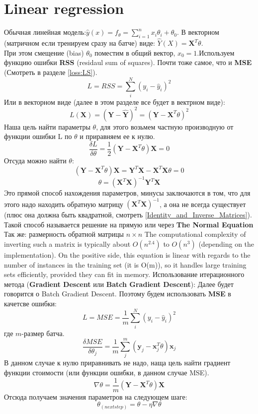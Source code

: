 \documentclass{book}
\begin{document}
\chapter{Linear regression}
Обычная линейная модель:$ \hat y(x) = f_\theta = \sum_{i=1}^{n}x_i\theta_i + \theta_0$. В векторном (матричном если тренируем сразу на батче) виде: $\hat Y(X) = \mathbf{X}^T\theta$.\\При этом смещение (bias) $\theta_0$ поместим в общий вектор, $x_0=1$.Используем функцию ошибки \textbf{RSS} (residaul sum of squares). Почти тоже самое, что и \textbf{MSE} (Смотреть в разделе \autoref{loss:LS}).$$L=RSS=\sum_i^N{(y_i-\hat y_i)^2}$$Или в векторном виде (далее в этом разделе все будет в вектрном виде):$$L(\mathbf{X})=(\mathbf{Y}-\hat{\mathbf{Y}})^2=(\mathbf{Y}-\mathbf{X}^T\theta)^2$$Наша цель найти параметры $\theta$, для этого возьмем частную производную от функции ошибки L по $\theta$ и приравняем ее к нулю.$$\frac{\delta L}{\delta \theta}=\frac{1}{2}(\mathbf{Y} - \mathbf{X}^T\theta)\mathbf{X}=0$$Отсуда можно найти $\theta$:$$(\mathbf{Y} - \mathbf{X}^T\theta)\mathbf{X}=\mathbf{Y}^T\mathbf{X}-\mathbf{X}^T\mathbf{X}\theta = 0$$ $$\theta=(\mathbf{X}^T\mathbf{X})^{-1}\mathbf{Y}^T\mathbf{X}$$Это прямой способ нахождения параметров, минусы заключаются в том, что для этого надо находить обратную матрицу $(\mathbf{X}^T\mathbf{X})^{-1}$, а она не всегда существует (плюс она должна быть квадратной, смотреть \autoref{Identity_and_Inverse_Matrices}). Такой способ называется решение на прямую или через \textbf{The Normal Equation} Так же: размерность обратной матрицы $n\times n$ The computational complexity of inverting such a matrix is typically about $O(n^2.4)$ to $O(n^3)$ (depending on the implementation). On the positive side, this equation is linear with regards to the number of instances in the training set (it is
O(m)), so it handles large training sets efficiently, provided they can fit in memory.
Использование итерационного метода (\textbf{Gradient Descent} или \textbf{Batch Gradient Descent}): Далее будет говорится о Batch Gradient Descent. Поэтому будем использовать \textbf{MSE} в качетсве ошибки:$$L=MSE=\frac{1}{m}\sum_i^N{(y_i-\hat y_i)^2}$$где $m$-размер батча.$$\frac{\delta MSE}{\delta \theta_j}=\frac{1}{m}\sum_j^m(\mathbf{y}_j - \mathbf{x}_j^T\theta)\mathbf{x}_j$$В данном случае к нулю приравнивать не надо, наща цель найти градиент функции стоимости (или функции ошибки, в данном случае MSE).$$\nabla \theta = \frac{1}{m}(\mathbf{Y} - \mathbf{X}^T\theta)\mathbf{X}$$Отсюда получаем значения параметров на следующем шаге: $$\theta_{(next step)}=\theta-\eta\nabla\theta$$
\end{document}
